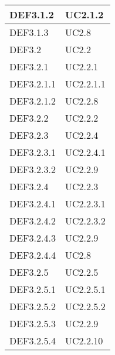 \documentclass{scalatekids-article}
\begin{document}
\begin{longtable}[H]{|p{5.5cm}|p{5.5cm}|}
  \hline
  DEF3.1.2 & \multiLineCell[t]{UC2.1.2\\}\\
  \hline
  DEF3.1.3 & \multiLineCell[t]{UC2.8\\}\\
  \hline
  DEF3.2 & \multiLineCell[t]{UC2.2\\}\\
  \hline
  DEF3.2.1 & \multiLineCell[t]{UC2.2.1\\}\\
  \hline
  DEF3.2.1.1 & \multiLineCell[t]{UC2.2.1.1\\}\\
  \hline
  DEF3.2.1.2 & \multiLineCell[t]{UC2.2.8\\}\\
  \hline
  DEF3.2.2 & \multiLineCell[t]{UC2.2.2\\}\\
  \hline
  DEF3.2.3 & \multiLineCell[t]{UC2.2.4\\}\\
  \hline
  DEF3.2.3.1 & \multiLineCell[t]{UC2.2.4.1\\}\\
  \hline
  DEF3.2.3.2 & \multiLineCell[t]{UC2.2.9\\}\\
  \hline
  DEF3.2.4 & \multiLineCell[t]{UC2.2.3\\}\\
  \hline
  DEF3.2.4.1 & \multiLineCell[t]{UC2.2.3.1\\}\\
  \hline
  DEF3.2.4.2 & \multiLineCell[t]{UC2.2.3.2\\}\\
  \hline
  DEF3.2.4.3 & \multiLineCell[t]{UC2.2.9\\}\\
  \hline
  DEF3.2.4.4 & \multiLineCell[t]{UC2.8\\}\\
  \hline
  DEF3.2.5 & \multiLineCell[t]{UC2.2.5\\}\\
  \hline
  DEF3.2.5.1 & \multiLineCell[t]{UC2.2.5.1\\}\\
  \hline
  DEF3.2.5.2 & \multiLineCell[t]{UC2.2.5.2\\}\\
  \hline
  DEF3.2.5.3 & \multiLineCell[t]{UC2.2.9\\}\\
  \hline
  DEF3.2.5.4 & \multiLineCell[t]{UC2.2.10\\}\\

\end{longtable}
\end{document}
